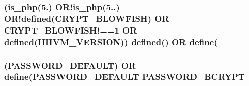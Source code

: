 \subsubsection[{defined}]{ ({\bf is\+\_\+php}(\textquotesingle{}5.\textquotesingle{}) O\+R!is\+\_\+php(\textquotesingle{}5..\textquotesingle{}) O\+R!defined(\textquotesingle{}C\+R\+Y\+P\+T\+\_\+\+B\+L\+O\+W\+F\+I\+S\+H\textquotesingle{}) O\+R C\+R\+Y\+P\+T\+\_\+\+B\+L\+O\+W\+F\+I\+S\+H!==1 O\+R defined(\textquotesingle{}H\+H\+V\+M\+\_\+\+V\+E\+R\+S\+I\+O\+N\textquotesingle{})) defined(\textquotesingle{}) O\+R define(\textquotesingle{}}\label{password_8php_aabb8e1f89683202c71f81779040eb22f}
\hypertarget{password_8php_a71c35e51b9c76d5ecb437d588ab8f046}{}
\subsubsection[{P\+A\+S\+S\+W\+O\+R\+D\+\_\+\+B\+C\+R\+Y\+P\+T}]{ (\textquotesingle{}P\+A\+S\+S\+W\+O\+R\+D\+\_\+\+D\+E\+F\+A\+U\+L\+T\textquotesingle{}) O\+R define(\textquotesingle{}P\+A\+S\+S\+W\+O\+R\+D\+\_\+\+D\+E\+F\+A\+U\+L\+T\textquotesingle{} P\+A\+S\+S\+W\+O\+R\+D\+\_\+\+B\+C\+R\+Y\+P\+T}\label{password_8php_a71c35e51b9c76d5ecb437d588ab8f046}
